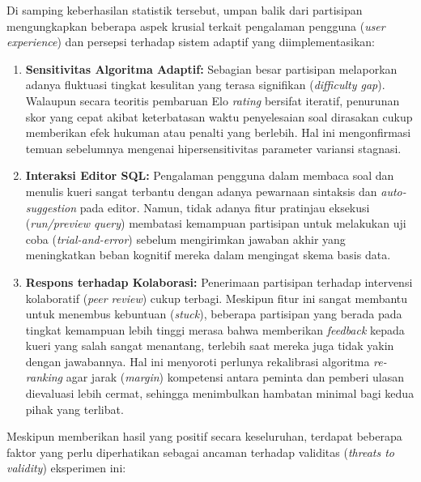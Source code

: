 Di samping keberhasilan statistik tersebut, umpan balik dari partisipan mengungkapkan beberapa aspek krusial terkait pengalaman pengguna (\textit{user experience}) dan persepsi terhadap sistem adaptif yang diimplementasikan:
\begin{enumerate}
    \item \textbf{Sensitivitas Algoritma Adaptif:} Sebagian besar partisipan melaporkan adanya fluktuasi tingkat kesulitan yang terasa signifikan (\textit{difficulty gap}). Walaupun secara teoritis pembaruan Elo \textit{rating} bersifat iteratif, penurunan skor yang cepat akibat keterbatasan waktu penyelesaian soal dirasakan cukup memberikan efek hukuman atau penalti yang berlebih. Hal ini mengonfirmasi temuan sebelumnya mengenai hipersensitivitas parameter variansi stagnasi.
    \item \textbf{Interaksi Editor SQL:} Pengalaman pengguna dalam membaca soal dan menulis kueri sangat terbantu dengan adanya pewarnaan sintaksis dan \linebreak \textit{auto-suggestion} pada editor. Namun, tidak adanya fitur pratinjau eksekusi (\textit{run/preview query}) membatasi kemampuan partisipan untuk melakukan uji coba (\textit{trial-and-error}) sebelum mengirimkan jawaban akhir yang meningkatkan beban kognitif mereka dalam mengingat skema basis data.
    \item \textbf{Respons terhadap Kolaborasi:} Penerimaan partisipan terhadap intervensi kolaboratif (\textit{peer review}) cukup terbagi. Meskipun fitur ini sangat membantu untuk menembus kebuntuan (\textit{stuck}), beberapa partisipan yang berada pada tingkat kemampuan lebih tinggi merasa bahwa memberikan \textit{feedback} kepada kueri yang salah sangat menantang, terlebih saat mereka juga tidak yakin dengan jawabannya. Hal ini menyoroti perlunya rekalibrasi algoritma \textit{re-ranking} agar jarak (\textit{margin}) kompetensi antara peminta dan pemberi ulasan dievaluasi lebih cermat, sehingga menimbulkan hambatan minimal bagi kedua pihak yang terlibat.
\end{enumerate}

Meskipun memberikan hasil yang positif secara keseluruhan, terdapat beberapa faktor yang perlu diperhatikan sebagai ancaman terhadap validitas (\textit{threats to validity}) eksperimen ini:

